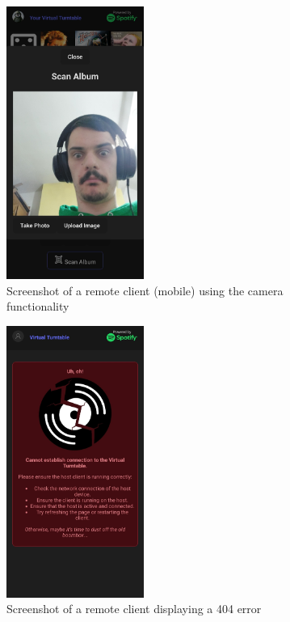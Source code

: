 \begin{uomappendix}
            \begin{figure}[h]
                \centering
                \includegraphics[width=0.4\textwidth]{images/screenshots/PHONE_Cam.jpg}
                \caption{Screenshot of a remote client (mobile) using the camera functionality}
                \label{fig:phoneCam}
            \end{figure}
            
            \begin{figure}[h]
                \centering
                \includegraphics[width=0.4\textwidth]{images/screenshots/PHONE_Error.jpg}
                \caption{Screenshot of a remote client displaying a 404 error}
                \label{fig:phoneError}
            \end{figure}
    

\end{uomappendix}
